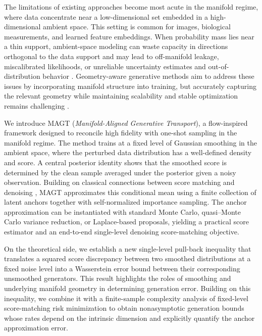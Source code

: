 \documentclass[12pt]{article}
\theoremstyle{definition} %
\providecommand{\method}{MAGT} %
\begin{document}
The limitations of existing approaches become most acute in the manifold regime, where data concentrate near a low-dimensional set embedded in a high-dimensional ambient space. 
This setting is common for images, biological measurements, and learned feature embeddings. When probability mass lies near a thin support, ambient-space modeling can waste capacity in directions orthogonal to the data support and may lead to off-manifold leakage, miscalibrated likelihoods, or unreliable uncertainty estimates and out-of-distribution behavior \citep{nalisnick2019deep, kirichenko2020nout, ren2019likelihood}. Geometry-aware generative methods aim to address these issues by incorporating manifold structure into training, but accurately capturing the relevant geometry while maintaining scalability and stable optimization remains challenging \citep{debortoli2022riemannian, huang2022riemannian}.

We introduce \method{} (\emph{Manifold-Aligned Generative Transport}), a flow-inspired framework designed to reconcile high fidelity with one-shot sampling in the manifold regime. The method trains at a fixed level of Gaussian smoothing in the ambient space, where the perturbed data distribution has a well-defined density and score. A central posterior identity shows that the smoothed score is determined by the clean sample averaged under the posterior given a noisy observation. Building on classical connections between score matching and denoising \citep{hyvarinen2005scorematching,vincent2011scoredae}, \method{} approximates this conditional mean using a finite collection of latent anchors together with self-normalized importance sampling. The anchor approximation can be instantiated with standard Monte Carlo, quasi--Monte Carlo variance reduction, or Laplace-based proposals, yielding a practical score estimator and an end-to-end single-level denoising score-matching objective.

On the theoretical side, we establish a new single-level pull-back inequality that translates a squared score discrepancy between two smoothed distributions at a fixed noise level into a Wasserstein error bound between their corresponding unsmoothed generators. This result highlights the roles of smoothing and underlying manifold geometry in determining generation error. Building on this inequality, we combine it with a finite-sample complexity analysis of fixed-level score-matching risk minimization to obtain nonasymptotic generation bounds whose rates depend on the intrinsic dimension and explicitly quantify the anchor approximation error.
\end{document}
